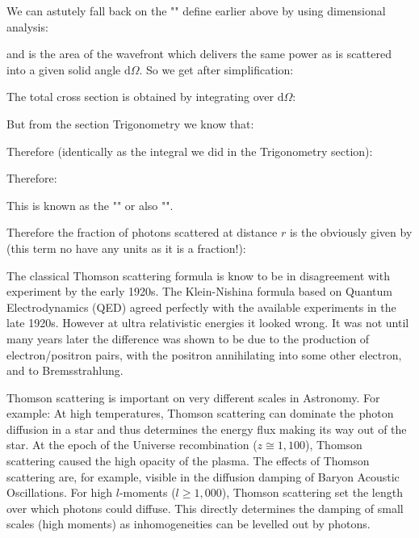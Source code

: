 	We can astutely fall back on the "" define earlier above by using dimensional analysis:
	
	and is the area of the wavefront which delivers the same power as is scattered into a given solid angle $\mathrm{d}\Omega$. So we get after simplification:
	
	The total cross section is obtained by integrating over $\mathrm{d}\Omega$:
	
	But from the section Trigonometry we know that:
	
	Therefore (identically as the integral we did in the Trigonometry section):
	
	Therefore:
		
	This is known as the "" or also "".
	
	Therefore the fraction of photons scattered at distance $r$ is the obviously given by (this term no have any units as it is a fraction!):
	
	The classical Thomson scattering formula is know to be in disagreement with experiment by the early 1920s. The Klein-Nishina formula based on Quantum Electrodynamics (QED) agreed perfectly with the available experiments in the late 1920s. However at ultra relativistic energies it looked wrong. It was not until many years later the difference was shown to be due to the production of electron/positron pairs, with the positron annihilating into some other electron, and to Bremsstrahlung. 
	
	\begin{tcolorbox}[title=Remark,colframe=black,arc=10pt]
	Thomson scattering is important on very different scales in Astronomy. For example: At high temperatures, Thomson scattering can dominate the photon diffusion in a star and thus determines the energy flux making its way out of the star. At the epoch of the Universe recombination ($z \cong 1,100$), Thomson scattering caused the high opacity of the plasma. The effects of Thomson scattering are, for example, visible in the diffusion damping of Baryon Acoustic Oscillations. For high $l$-moments ($l\geq 1,000$), Thomson scattering set the length over which photons could diffuse. This directly determines the damping of small scales (high moments) as inhomogeneities can be levelled out by photons.
	\end{tcolorbox}
	
